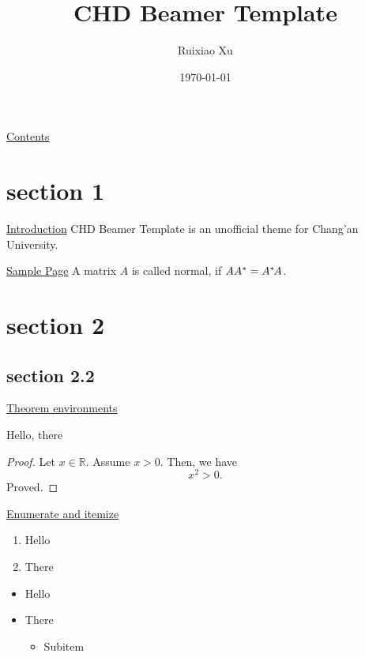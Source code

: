 \documentclass[11pt,aspectratio=43,xcolor={dvipsnames},hyperref={pdftex,pdfpagemode=UseNone,hidelinks,pdfdisplaydoctitle=true},usepdftitle=false]{ctexbeamer}
\title{CHD Beamer Template}
\author{Ruixiao Xu}
\institute{School of Information Engineering\\Chang'an University}
\date{\today}
\begin{document}
\begin{frame}
  \maketitle
\end{frame}

\begin{frame}{\underline{Contents}}
  \tableofcontents
\end{frame}

\section{section 1}
\begin{frame}{\underline{Introduction}}
  \alert{CHD Beamer Template} is an unofficial theme for Chang'an University.
\end{frame}

\begin{frame}{\underline{Sample Page}}
  A matrix $A$ is called normal, if $AA^*=A^*\mskip-2muA$.
\end{frame}

\section{section 2}
\subsection{section 2.2}
\begin{frame}{\underline{Theorem environments}}

  \begin{theorem}
    Hello, there
  \end{theorem}

  \begin{proof}
    Let $x \in \mathbb{R}$. Assume $x > 0$. Then, we have
    \begin{equation}
      x^2 > 0.
    \end{equation}
    Proved.
  \end{proof}
\end{frame}

\begin{frame}{\underline{Enumerate and itemize}}
  \begin{enumerate}
    \item Hello
    \item There
  \end{enumerate}
  \begin{itemize}
    \item Hello
    \item There
          \begin{itemize}
            \item Subitem
          \end{itemize}
  \end{itemize}
\end{frame}
\end{document}
